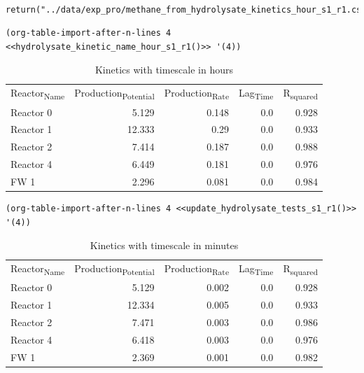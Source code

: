 \documentclass[11pt]{article}
\begin{document}
\begin{verbatim}

return("../data/exp_pro/methane_from_hydrolysate_kinetics_hour_s1_r1.csv")
\end{verbatim}

\begin{verbatim}
(org-table-import-after-n-lines 4 <<hydrolysate_kinetic_name_hour_s1_r1()>> '(4))
\end{verbatim}

\begin{table}[htbp]
\caption{Kinetics with timescale in hours}
\centering
\begin{tabular}{lrrrr}
Reactor\textsubscript{Name} & Production\textsubscript{Potential} & Production\textsubscript{Rate} & Lag\textsubscript{Time} & R\textsubscript{squared}\\[0pt]
Reactor 0 & 5.129 & 0.148 & 0.0 & 0.928\\[0pt]
Reactor 1 & 12.333 & 0.29 & 0.0 & 0.933\\[0pt]
Reactor 2 & 7.414 & 0.187 & 0.0 & 0.988\\[0pt]
Reactor 4 & 6.449 & 0.181 & 0.0 & 0.976\\[0pt]
FW 1 & 2.296 & 0.081 & 0.0 & 0.984\\[0pt]
\end{tabular}
\end{table}

\begin{verbatim}
(org-table-import-after-n-lines 4 <<update_hydrolysate_tests_s1_r1()>> '(4))
\end{verbatim}

\begin{table}[htbp]
\caption{Kinetics with timescale in minutes}
\centering
\begin{tabular}{lrrrr}
Reactor\textsubscript{Name} & Production\textsubscript{Potential} & Production\textsubscript{Rate} & Lag\textsubscript{Time} & R\textsubscript{squared}\\[0pt]
Reactor 0 & 5.129 & 0.002 & 0.0 & 0.928\\[0pt]
Reactor 1 & 12.334 & 0.005 & 0.0 & 0.933\\[0pt]
Reactor 2 & 7.471 & 0.003 & 0.0 & 0.986\\[0pt]
Reactor 4 & 6.418 & 0.003 & 0.0 & 0.976\\[0pt]
FW 1 & 2.369 & 0.001 & 0.0 & 0.982\\[0pt]
\end{tabular}
\end{table}
\end{document}

